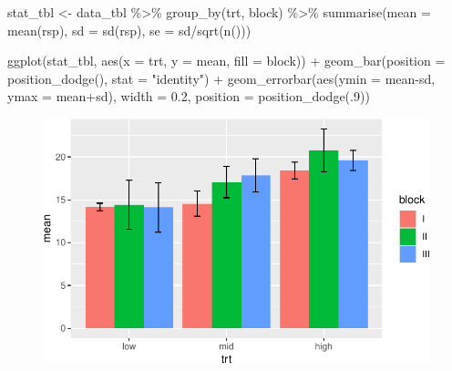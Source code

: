 \documentclass[
  letterpaper,
  DIV=11,
  oneside]{scrreport}
\newenvironment{Shaded}{\begin{snugshade}}{\end{snugshade}}
\newcommand{\AttributeTok}[1]{\textcolor[rgb]{0.40,0.45,0.13}{#1}}
\newcommand{\DecValTok}[1]{\textcolor[rgb]{0.68,0.00,0.00}{#1}}
\newcommand{\FloatTok}[1]{\textcolor[rgb]{0.68,0.00,0.00}{#1}}
\newcommand{\FunctionTok}[1]{\textcolor[rgb]{0.28,0.35,0.67}{#1}}
\newcommand{\NormalTok}[1]{\textcolor[rgb]{0.00,0.23,0.31}{#1}}
\newcommand{\OtherTok}[1]{\textcolor[rgb]{0.00,0.23,0.31}{#1}}
\newcommand{\SpecialCharTok}[1]{\textcolor[rgb]{0.37,0.37,0.37}{#1}}
\newcommand{\StringTok}[1]{\textcolor[rgb]{0.13,0.47,0.30}{#1}}
\begin{document}
\begin{Shaded}
\begin{Highlighting}[]
\NormalTok{stat\_tbl }\OtherTok{\textless{}{-}}\NormalTok{ data\_tbl }\SpecialCharTok{\%\textgreater{}\%} 
  \FunctionTok{group\_by}\NormalTok{(trt, block) }\SpecialCharTok{\%\textgreater{}\%} 
  \FunctionTok{summarise}\NormalTok{(}\AttributeTok{mean =} \FunctionTok{mean}\NormalTok{(rsp),}
            \AttributeTok{sd =} \FunctionTok{sd}\NormalTok{(rsp),}
            \AttributeTok{se =}\NormalTok{ sd}\SpecialCharTok{/}\FunctionTok{sqrt}\NormalTok{(}\FunctionTok{n}\NormalTok{()))}

\FunctionTok{ggplot}\NormalTok{(stat\_tbl, }\FunctionTok{aes}\NormalTok{(}\AttributeTok{x =}\NormalTok{ trt, }\AttributeTok{y =}\NormalTok{ mean, }\AttributeTok{fill =}\NormalTok{ block)) }\SpecialCharTok{+} 
    \FunctionTok{geom\_bar}\NormalTok{(}\AttributeTok{position =} \FunctionTok{position\_dodge}\NormalTok{(), }\AttributeTok{stat =} \StringTok{"identity"}\NormalTok{) }\SpecialCharTok{+}
    \FunctionTok{geom\_errorbar}\NormalTok{(}\FunctionTok{aes}\NormalTok{(}\AttributeTok{ymin =}\NormalTok{ mean}\SpecialCharTok{{-}}\NormalTok{sd, }\AttributeTok{ymax =}\NormalTok{ mean}\SpecialCharTok{+}\NormalTok{sd),}
                  \AttributeTok{width =} \FloatTok{0.2}\NormalTok{,}
                  \AttributeTok{position =} \FunctionTok{position\_dodge}\NormalTok{(.}\DecValTok{9}\NormalTok{))}
\end{Highlighting}
\end{Shaded}

\begin{figure}[H]

{\centering \includegraphics{./app-example-analysis_files/figure-pdf/unnamed-chunk-6-1.pdf}

}

\end{figure}
\end{document}
